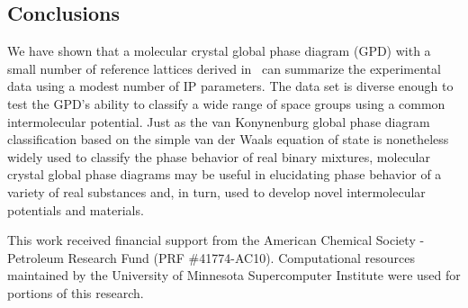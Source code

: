 \documentclass[preprint]{revtex4}
\begin{document}
\subsection{Conclusions}

We have shown that a molecular crystal global phase diagram (GPD)
with a small number of reference lattices derived
in~\cite{McClurg05} can summarize the experimental data using a
modest number of IP parameters. The data set is diverse enough to
test the GPD's ability to classify a wide range of space groups
using a common intermolecular potential. Just as the van Konynenburg
global phase diagram classification based on the simple van der
Waals equation of state is nonetheless widely used to classify the
phase behavior of real binary mixtures, molecular crystal global
phase diagrams may be useful in elucidating phase behavior of a
variety of real substances and, in turn, used to develop novel
intermolecular potentials and materials.

\begin{acknowledgments}
This work received financial support from the American Chemical
Society - Petroleum Research Fund (PRF \#41774-AC10).
%
Computational resources maintained by the University of Minnesota
Supercomputer Institute were used for portions of this research.
\end{acknowledgments}

\pagebreak


%
%


\pagebreak
\end{document}
